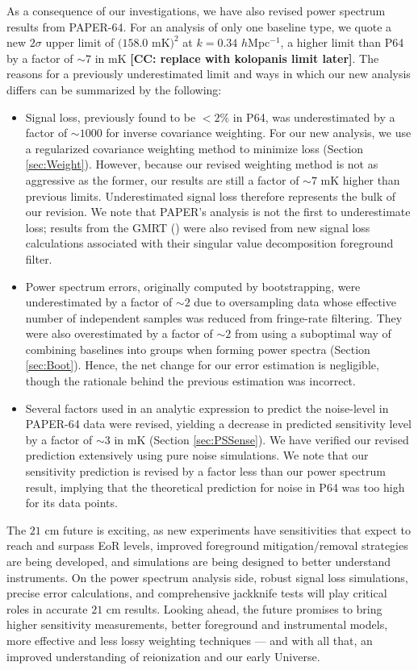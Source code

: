 \documentclass[preprint2,numberedappendix,tighten]{aastex6}  %
\newcommand{\cc}[1]{{\color{purple} \textbf{[CC: #1]}}}
\begin{document}
As a consequence of our investigations, we have also revised power spectrum results from PAPER-64. For an analysis of only one baseline type, we quote a new $2\sigma$ upper limit of $(158.0$ mK$)^{2}$ at $k=0.34$ $h$Mpc$^{-1}$, a higher limit than P64 by a factor of $\sim7$ in mK \cc{replace with kolopanis limit later}. The reasons for a previously underestimated limit and ways in which our new analysis differs can be summarized by the following:

\begin{itemize}
\item Signal loss, previously found to be $<2\%$ in P64, was underestimated by a factor of $\sim$$1000$ for inverse covariance weighting. For our new analysis, we use a regularized covariance weighting method to minimize loss (Section \ref{sec:Weight}). However, because our revised weighting method is not as aggressive as the former, our results are still a factor of $\sim7$ mK higher than previous limits. Underestimated signal loss therefore represents the bulk of our revision. We note that PAPER's analysis is not the first to underestimate loss; results from the GMRT (\citealt{paciga_et_al2013}) were also revised from new signal loss calculations associated with their singular value decomposition foreground filter.
\item Power spectrum errors, originally computed by bootstrapping, were underestimated by a factor of $\sim$$2$ due to oversampling data whose effective number of independent samples was reduced from fringe-rate filtering. They were also overestimated by a factor of $\sim$$2$ from using a suboptimal way of combining baselines into groups when forming power spectra (Section \ref{sec:Boot}). Hence, the net change for our error estimation is negligible, though the rationale behind the previous estimation was incorrect.
\item Several factors used in an analytic expression to predict the noise-level in PAPER-64 data were revised, yielding a decrease in predicted sensitivity level by a factor of $\sim$$3$ in mK (Section \ref{sec:PSSense}). We have verified our revised prediction extensively using pure noise simulations. We note that our sensitivity prediction is revised by a factor less than our power spectrum result, implying that the theoretical prediction for noise in P64 was too high for its data points.
\end{itemize}

The $21$ cm future is exciting, as new experiments have sensitivities that expect to reach and surpass EoR levels, improved foreground mitigation/removal strategies are being developed, and simulations are being designed to better understand instruments. On the power spectrum analysis side, robust signal loss simulations, precise error calculations, and comprehensive jackknife tests will play critical roles in accurate $21$ cm results. Looking ahead, the future promises to bring higher sensitivity measurements, better foreground and instrumental models, more effective and less lossy weighting techniques --- and with all that, an improved understanding of reionization and our early Universe.
\end{document}
